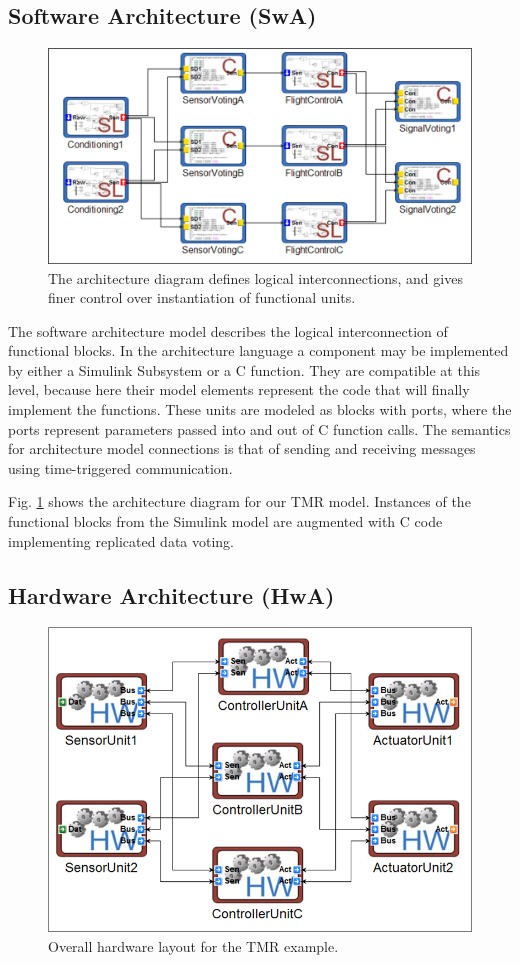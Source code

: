\subsection{Software Architecture (SwA)}

\begin{figure}
	\centering
   \includegraphics[width=0.7\columnwidth]{diagrams/tmr_arch.png}
   \caption{The architecture diagram defines logical interconnections, and gives finer control over instantiation of functional units.}
   \label{fig:tmr_arch}
\end{figure}

The software architecture model describes the logical interconnection of functional blocks.  In the architecture language a component may be implemented by either a Simulink Subsystem or a C function.  They are compatible at this level, because here their model elements represent the code that will finally implement the functions.  These units are modeled as blocks with ports, where the ports represent parameters passed into and out of C function calls.  The semantics for architecture model connections is that of sending and receiving messages using time-triggered communication.  

Fig. \ref{fig:tmr_arch} shows the architecture diagram for our TMR model.  Instances of the functional blocks from the Simulink model are augmented with C code implementing replicated data voting.

\subsection{Hardware Architecture (HwA)}

\begin{figure}
	\centering
   \includegraphics[width=0.75\columnwidth]{diagrams/tmr_hardware.png}
   \caption{Overall hardware layout for the TMR example.}
   \label{fig:tmr_hardware}
\end{figure}

